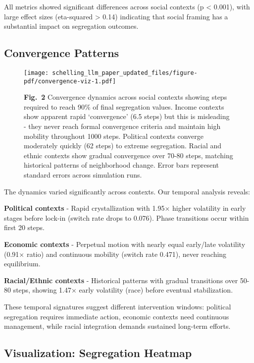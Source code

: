 \documentclass[pdflatex,sn-basic]{sn-jnl}%
\begin{document}
All metrics showed significant differences across social contexts (p \textless{} 0.001), with large effect sizes (eta-squared \textgreater{} 0.14) indicating that social framing has a substantial impact on segregation outcomes.

\subsection{Convergence Patterns}\label{convergence-patterns}


\begin{figure}[ht]
\centering
\texttt{[image: schelling\_llm\_paper\_updated\_files/figure-pdf/convergence-viz-1.pdf]}
\caption{\textbf{Fig.~2} Convergence dynamics across social contexts showing
steps required to reach 90\% of final segregation values. Income
contexts show apparent rapid `convergence' (6.5 steps) but this is
misleading - they never reach formal convergence criteria and maintain
high mobility throughout 1000 steps. Political contexts converge
moderately quickly (62 steps) to extreme segregation. Racial and ethnic
contexts show gradual convergence over 70-80 steps, matching historical
patterns of neighborhood change. Error bars represent standard errors
across simulation runs.}
\label{fig:convergence}
\end{figure}

The dynamics varied significantly across contexts. Our temporal analysis
reveals:

\textbf{Political contexts} - Rapid crystallization with 1.95× higher
volatility in early stages before lock-in (switch rate drops to 0.076).
Phase transitions occur within first 20 steps.

\textbf{Economic contexts} - Perpetual motion with nearly equal
early/late volatility (0.91× ratio) and continuous mobility (switch rate
0.471), never reaching equilibrium.

\textbf{Racial/Ethnic contexts} - Historical patterns with gradual
transitions over 50-80 steps, showing 1.47× early volatility (race)
before eventual stabilization.

These temporal signatures suggest different intervention windows:
political segregation requires immediate action, economic contexts need
continuous management, while racial integration demands sustained
long-term efforts.

\subsection{Visualization: Segregation
Heatmap}\label{visualization-segregation-heatmap}
\end{document}
